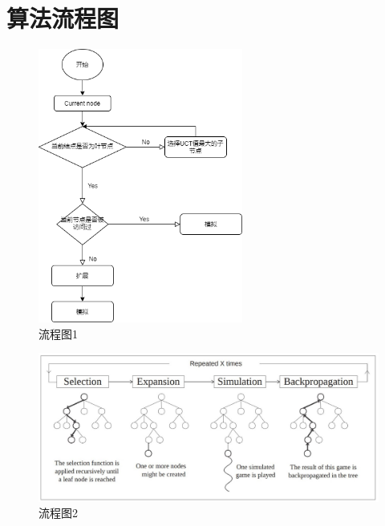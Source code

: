 \documentclass{ctexrep}
\begin{document}
\section{算法流程图}


\begin{figure}[h] %
    \centering %
    \includegraphics[width=0.6\textwidth]{mcts.png} %
    \caption{流程图1} %
    \label{wolf} %
\end{figure}%



\begin{figure}[H] %
    \centering %
    \includegraphics[width=1\textwidth]{sss.jpeg} %
    \caption{流程图2} %
    \label{wolf} %
\end{figure}%
\end{document}
